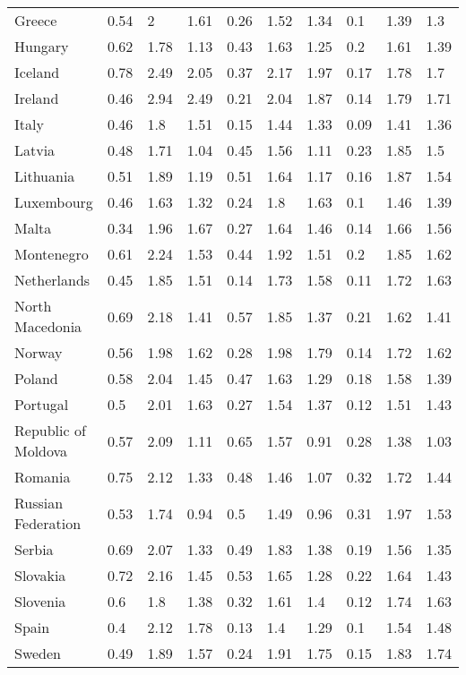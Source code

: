 \begin{longtable}[t]{llllllllll}
Greece & 0.54 & 2 & 1.61 & 0.26 & 1.52 & 1.34 & 0.1 & 1.39 & 1.3\\
Hungary & 0.62 & 1.78 & 1.13 & 0.43 & 1.63 & 1.25 & 0.2 & 1.61 & 1.39\\
Iceland & 0.78 & 2.49 & 2.05 & 0.37 & 2.17 & 1.97 & 0.17 & 1.78 & 1.7\\
Ireland & 0.46 & 2.94 & 2.49 & 0.21 & 2.04 & 1.87 & 0.14 & 1.79 & 1.71\\
Italy & 0.46 & 1.8 & 1.51 & 0.15 & 1.44 & 1.33 & 0.09 & 1.41 & 1.36\\
Latvia & 0.48 & 1.71 & 1.04 & 0.45 & 1.56 & 1.11 & 0.23 & 1.85 & 1.5\\
Lithuania & 0.51 & 1.89 & 1.19 & 0.51 & 1.64 & 1.17 & 0.16 & 1.87 & 1.54\\
Luxembourg & 0.46 & 1.63 & 1.32 & 0.24 & 1.8 & 1.63 & 0.1 & 1.46 & 1.39\\
Malta & 0.34 & 1.96 & 1.67 & 0.27 & 1.64 & 1.46 & 0.14 & 1.66 & 1.56\\
Montenegro & 0.61 & 2.24 & 1.53 & 0.44 & 1.92 & 1.51 & 0.2 & 1.85 & 1.62\\
Netherlands & 0.45 & 1.85 & 1.51 & 0.14 & 1.73 & 1.58 & 0.11 & 1.72 & 1.63\\
North Macedonia & 0.69 & 2.18 & 1.41 & 0.57 & 1.85 & 1.37 & 0.21 & 1.62 & 1.41\\
Norway & 0.56 & 1.98 & 1.62 & 0.28 & 1.98 & 1.79 & 0.14 & 1.72 & 1.62\\
Poland & 0.58 & 2.04 & 1.45 & 0.47 & 1.63 & 1.29 & 0.18 & 1.58 & 1.39\\
Portugal & 0.5 & 2.01 & 1.63 & 0.27 & 1.54 & 1.37 & 0.12 & 1.51 & 1.43\\
Republic of Moldova & 0.57 & 2.09 & 1.11 & 0.65 & 1.57 & 0.91 & 0.28 & 1.38 & 1.03\\
Romania & 0.75 & 2.12 & 1.33 & 0.48 & 1.46 & 1.07 & 0.32 & 1.72 & 1.44\\
Russian Federation & 0.53 & 1.74 & 0.94 & 0.5 & 1.49 & 0.96 & 0.31 & 1.97 & 1.53\\
Serbia & 0.69 & 2.07 & 1.33 & 0.49 & 1.83 & 1.38 & 0.19 & 1.56 & 1.35\\
Slovakia & 0.72 & 2.16 & 1.45 & 0.53 & 1.65 & 1.28 & 0.22 & 1.64 & 1.43\\
Slovenia & 0.6 & 1.8 & 1.38 & 0.32 & 1.61 & 1.4 & 0.12 & 1.74 & 1.63\\
Spain & 0.4 & 2.12 & 1.78 & 0.13 & 1.4 & 1.29 & 0.1 & 1.54 & 1.48\\
Sweden & 0.49 & 1.89 & 1.57 & 0.24 & 1.91 & 1.75 & 0.15 & 1.83 & 1.74\\

\end{longtable}

